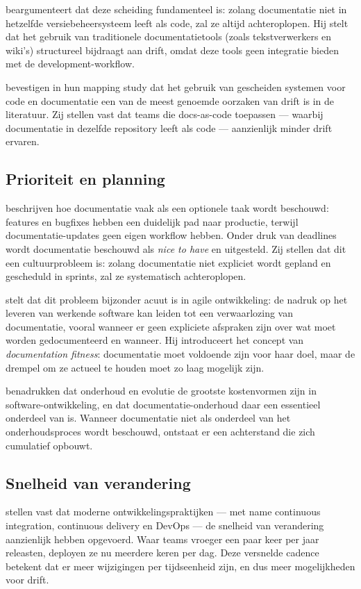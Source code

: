 \textcite{etter2016moderntechwriting} beargumenteert dat deze scheiding fundamenteel is: zolang documentatie niet in hetzelfde versiebeheersysteem leeft als code, zal ze altijd achteroplopen. Hij stelt dat het gebruik van traditionele documentatietools (zoals tekstverwerkers en wiki's) structureel bijdraagt aan drift, omdat deze tools geen integratie bieden met de development-workflow.

\textcite{theunissen2022mappingdocumentation} bevestigen in hun mapping study dat het gebruik van gescheiden systemen voor code en documentatie een van de meest genoemde oorzaken van drift is in de literatuur. Zij stellen vast dat teams die docs-as-code toepassen --- waarbij documentatie in dezelfde repository leeft als code --- aanzienlijk minder drift ervaren.

\subsection{Prioriteit en planning}
\textcite{bhatti2021docsdevelopers} beschrijven hoe documentatie vaak als een optionele taak wordt beschouwd: features en bugfixes hebben een duidelijk pad naar productie, terwijl documentatie-updates geen eigen workflow hebben. Onder druk van deadlines wordt documentatie beschouwd als \textit{nice to have} en uitgesteld. Zij stellen dat dit een cultuurprobleem is: zolang documentatie niet expliciet wordt gepland en gescheduld in sprints, zal ze systematisch achteroplopen.

\textcite{ruping2005agiledocumentation} stelt dat dit probleem bijzonder acuut is in agile ontwikkeling: de nadruk op het leveren van werkende software kan leiden tot een verwaarlozing van documentatie, vooral wanneer er geen expliciete afspraken zijn over wat moet worden gedocumenteerd en wanneer. Hij introduceert het concept van \textit{documentation fitness}: documentatie moet voldoende zijn voor haar doel, maar de drempel om ze actueel te houden moet zo laag mogelijk zijn.

\textcite{tripathy2014softwareevolution} benadrukken dat onderhoud en evolutie de grootste kostenvormen zijn in software-ontwikkeling, en dat documentatie-onderhoud daar een essentieel onderdeel van is. Wanneer documentatie niet als onderdeel van het onderhoudsproces wordt beschouwd, ontstaat er een achterstand die zich cumulatief opbouwt.

\subsection{Snelheid van verandering}
\textcite{theunissen2022mappingdocumentation} stellen vast dat moderne ontwikkelingspraktijken --- met name continuous integration, continuous delivery en DevOps --- de snelheid van verandering aanzienlijk hebben opgevoerd. Waar teams vroeger een paar keer per jaar releasten, deployen ze nu meerdere keren per dag. Deze versnelde cadence betekent dat er meer wijzigingen per tijdseenheid zijn, en dus meer mogelijkheden voor drift.


